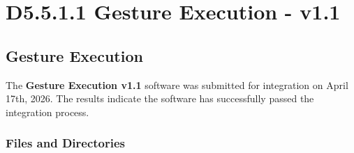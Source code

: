 \documentclass{CSSRforAfrica}
\begin{document}
  
%  




\section{D5.5.1.1 Gesture Execution - v1.1} 
\subsection{Gesture Execution} 
\label{subsection:gesture_execution}
The \textbf{Gesture Execution v1.1} software was submitted for integration on April 17th, 2026. The results indicate the software has successfully passed the integration process.

\subsubsection{Files and Directories}
 
\end{document}
